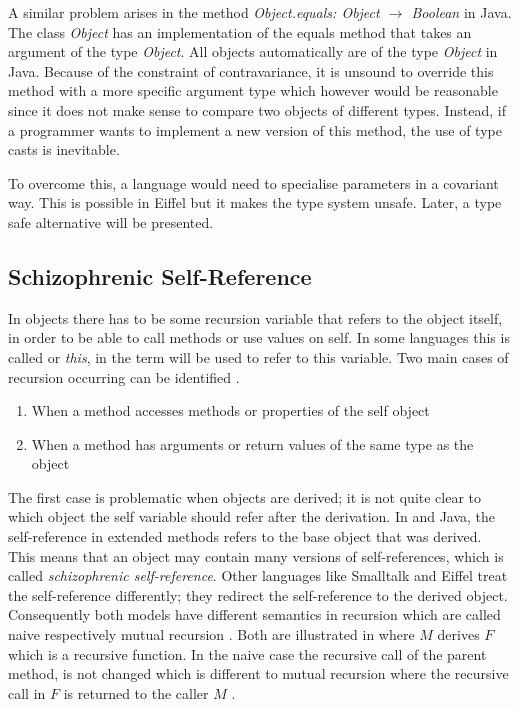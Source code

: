 A similar problem arises in the method \emph{Object.equals: Object
$\rightarrow$ Boolean} in Java. The class \emph{Object} has an
implementation of the equals method that takes an argument of the type
\emph{Object}. All objects automatically are of the type \emph{Object}
in Java. Because of the constraint of contravariance, it is unsound
to override this method with a more specific argument type which however would
be reasonable since it does not make sense to compare two objects
of different types. Instead, if a programmer wants to implement a new
version of this method, the use of type casts is inevitable.

To overcome this, a language would need to specialise parameters in a
covariant way. This is possible in Eiffel but it makes the type system
unsafe. Later, a type safe alternative will be presented.

\subsection{Schizophrenic Self-Reference}
\label{sec:schizoReferences}
In objects there has to be some recursion variable that refers to the
object itself, in order to be able to call methods or use values on self. In some
languages this is called \self or \emph{this}, in \ooplss
the term \self will be used to refer to this variable. Two main cases of
recursion occurring can be identified \cite{simons_theory_2003-2}.

\begin{enumerate}
	\item When a method accesses methods or properties of the self object
	\item When a method has arguments or return values of the same type as the object
\end{enumerate}

The first case is problematic when objects are derived; it is not
quite clear to which object the self variable should refer after
the derivation. In \cpp and Java, the self-reference in extended
methods refers to the base object that was derived. This means that an
object may contain many versions of self-references, which is called
\emph{schizophrenic self-reference}. Other languages like Smalltalk
and Eiffel treat the self-reference differently; they redirect the
self-reference to the derived object. Consequently both models have
different semantics in recursion which are called naive respectively
mutual recursion \cite{cook_denotational_1989}. Both are illustrated
in  where $M$ derives $F$ which is a recursive
function. In the naive case the recursive call of the parent method,
is not changed which is different to mutual recursion where the recursive
call in $F$ is returned to the caller $M$ \cite{simons_theory_2003-2}.

